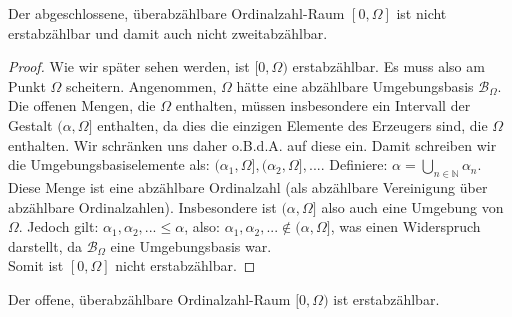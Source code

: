 \documentclass[11pt]{scrartcl}
\begin{document}
\begin{theorem}
	Der abgeschlossene, überabzählbare Ordinalzahl-Raum $[0,\Omega]$ ist nicht erstabzählbar und 
	damit auch nicht zweitabzählbar.
\end{theorem}
\begin{proof}
	Wie wir später sehen werden, ist $[0,\Omega)$ erstabzählbar. Es muss also am Punkt $\Omega$ scheitern.
	Angenommen, $\Omega$ hätte eine abzählbare Umgebungsbasis $\mathcal B_\Omega$. Die offenen Mengen, die $\Omega$
	enthalten, müssen insbesondere ein Intervall der Gestalt $(\alpha, \Omega]$ enthalten, da dies die einzigen 
	Elemente des Erzeugers sind, die $\Omega$ enthalten. Wir schränken uns daher o.B.d.A. auf diese ein. Damit schreiben
	wir die Umgebungsbasiselemente als: $(\alpha_1,\Omega],(\alpha_2, \Omega],...$. Definiere: $\alpha = \bigcup_{n\in\mathbb N} \alpha_n$.
	Diese Menge ist eine abzählbare Ordinalzahl (als abzählbare Vereinigung über abzählbare Ordinalzahlen). Insbesondere ist $(\alpha,\Omega]$ also
	auch eine Umgebung von $\Omega$. Jedoch gilt: $\alpha_1,\alpha_2,...\leq \alpha$, also: $\alpha_1,\alpha_2,...\notin (\alpha,\Omega]$, was
	einen Widerspruch darstellt, da $\mathcal B_\Omega$ eine Umgebungsbasis war.\\
	Somit ist $[0,\Omega]$ nicht erstabzählbar.
\end{proof}
\begin{theorem}
	Der offene, überabzählbare Ordinalzahl-Raum $[0,\Omega)$ ist erstabzählbar.
\end{theorem}
\end{document}
